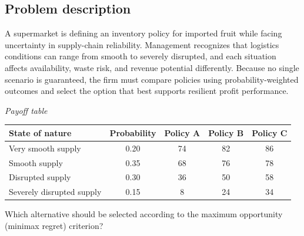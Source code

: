 \begin{ExamProblems}
		\subsection*{Problem description}
		A supermarket is defining an inventory policy for imported fruit while facing uncertainty in supply-chain reliability. Management recognizes that logistics conditions can range from smooth to severely disrupted, and each situation affects availability, waste risk, and revenue potential differently. Because no single scenario is guaranteed, the firm must compare policies using probability-weighted outcomes and select the option that best supports resilient profit performance.

		\begin{center}
			\textit{Payoff table} \par
			\begin{tabular}{l c c c c}
				\toprule
				State of nature & Probability & Policy A & Policy B & Policy C \\
				\midrule
				Very smooth supply & 0.20 & 74 & 82 & 86 \\
				Smooth supply & 0.35 & 68 & 76 & 78 \\
				Disrupted supply & 0.30 & 36 & 50 & 58 \\
				Severely disrupted supply & 0.15 & 8 & 24 & 34 \\
				\bottomrule
			\end{tabular}
		\end{center}

		Which alternative should be selected according to the maximum opportunity (minimax regret) criterion?


\end{ExamProblems}

